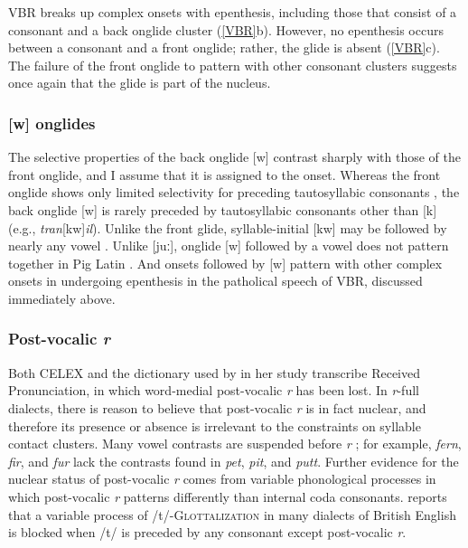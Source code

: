\noindent
VBR breaks up complex onsets with epenthesis, including those that consist of a consonant and a back onglide cluster (\ref{VBR}b). However, no epenthesis occurs between a consonant and a front onglide; rather, the glide is absent (\ref{VBR}c). The failure of the front onglide to pattern with other consonant clusters suggests once again that the glide is part of the nucleus. 


\subsubsection{[w] onglides}

The selective properties of the back onglide [w] contrast sharply with those of the front onglide, and I assume that it is assigned to the onset. Whereas the front onglide shows only limited selectivity for preceding tautosyllabic consonants \citep{Davis1995,Kaye1996}, the back onglide [w] is rarely preceded by tautosyllabic consonants other than [k] (e.g., \emph{tran}[kw]\emph{il}). Unlike the front glide, syllable-initial [kw] may be followed by nearly any vowel \citep[][161]{Davis1995}. Unlike [juː], onglide [w] followed by a vowel does not pattern together in Pig Latin \citep[][166]{Davis1995}. And onsets followed by [w] pattern with other complex onsets in undergoing epenthesis in the patholical speech of VBR, discussed immediately above.


\subsubsection{Post-vocalic \emph{r}}

Both CELEX and the dictionary used by \citet{Pierrehumbert1994} in her study transcribe Received Pronunciation, in which word-medial post-vocalic \emph{r} has been lost. In \emph{r}-full dialects, there is reason to believe that post-vocalic \emph{r} is in fact nuclear, and therefore its presence or absence is irrelevant to the constraints on syllable contact clusters. Many vowel contrasts are suspended before \emph{r} \citep[][255]{Harris1994}; for example, \emph{fern}, \emph{fir}, and \emph{fur} lack the contrasts found in \emph{pet}, \emph{pit}, and \emph{putt}. Further evidence for the nuclear status of post-vocalic \emph{r} comes from variable phonological processes in which post-vocalic \emph{r} patterns differently than internal coda consonants. \citeauthor{Harris1994} reports that a variable process of /t/-\textsc{Glottalization} in many dialects of British English is blocked when /t/ is preceded by any consonant except post-vocalic \emph{r}.

